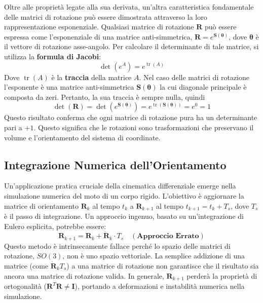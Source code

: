 \documentclass[11pt, a4paper]{report}
\begin{document}
Oltre alle proprietà legate alla sua derivata, un'altra caratteristica fondamentale delle matrici di rotazione può essere dimostrata attraverso la loro rappresentazione esponenziale. Qualsiasi matrice di rotazione \(\bm{R}\) può essere espressa come l'esponenziale di una matrice anti-simmetrica, \(\bm{R} = e^{\bm{S}(\bm{\theta})}\), dove \(\bm{\theta}\) è il vettore di rotazione asse-angolo. Per calcolare il determinante di tale matrice, si utilizza la \textbf{formula di Jacobi}:
\[
    \det(e^A) = e^{\operatorname{tr}(A)}
\]
Dove \(\operatorname{tr}(A)\) è la \textbf{traccia} della matrice \(A\). Nel caso delle matrici di rotazione l'esponente è una matrice anti-simmetrica \(\bm{S}(\bm{\theta})\) la cui diagonale principale è composta da zeri. Pertanto, la sua traccia è sempre nulla, quindi
\[
    \det(\bm{R}) = \det(e^{\bm{S}(\bm{\theta})}) = e^{\operatorname{tr}(\bm{S}(\bm{\theta}))} = e^0 = 1
\]
Questo risultato conferma che ogni matrice di rotazione pura ha un determinante pari a \(+1\). Questo significa che le rotazioni sono trasformazioni che preservano il volume e l'orientamento del sistema di coordinate.
\newpage
\subsection{Integrazione Numerica dell'Orientamento}
Un'applicazione pratica cruciale della cinematica differenziale emerge nella simulazione numerica del moto di un corpo rigido. L'obiettivo è aggiornare la matrice di orientamento \(\bm{R}_k\) al tempo \(t_k\) a \(\bm{R}_{k+1}\) al tempo \(t_{k+1} = t_k + T_s\), dove \(T_s\) è il passo di integrazione. Un approccio ingenuo, basato su un'integrazione di Eulero esplicita, potrebbe essere:
\[
    \bm{R}_{k+1} = \bm{R}_k + \dot{\bm{R}}_k \cdot T_s \quad (\textbf{Approccio Errato})
\]
Questo metodo è intrinsecamente fallace perché lo spazio delle matrici di rotazione, \(SO(3)\), non è uno spazio vettoriale. La semplice addizione di una matrice (come \(\dot{\bm{R}}_k T_s\)) a una matrice di rotazione non garantisce che il risultato sia ancora una matrice di rotazione valida. In generale, \(\bm{R}_{k+1}\) perderà la proprietà di ortogonalità (\(\bm{R}^T\bm{R} \neq \bm{I}\)), portando a deformazioni e instabilità numerica nella simulazione.
\end{document}
